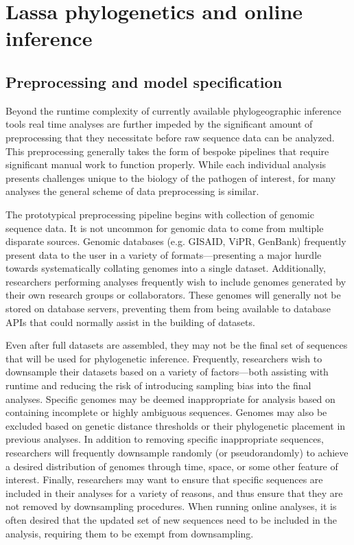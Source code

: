 \section{Lassa phylogenetics and online inference}

\subsection{Preprocessing and model specification}

Beyond the runtime complexity of currently available phylogeographic inference tools real time analyses are further impeded by the significant amount of preprocessing that they necessitate before raw sequence data can be analyzed.
This preprocessing generally takes the form of bespoke pipelines that require significant manual work to function properly.
While each individual analysis presents challenges unique to the biology of the pathogen of interest, for many analyses the general scheme of data preprocessing is similar.

The prototypical preprocessing pipeline begins with collection of genomic sequence data.
It is not uncommon for genomic data to come from multiple disparate sources.
Genomic databases (e.g. GISAID\cite{shu2017gisaid}, ViPR\cite{pickett2012vipr}, GenBank\cite{benson2012genbank}) frequently present data to the user in a variety of formats---presenting a major hurdle towards systematically collating genomes into a single dataset.
Additionally, researchers performing analyses frequently wish to include genomes generated by their own research groups or collaborators.
These genomes will generally not be stored on database servers, preventing them from being available to database APIs that could normally assist in the building of datasets.

Even after full datasets are assembled, they may not be the final set of sequences that will be used for phylogenetic inference.
Frequently, researchers wish to downsample their datasets based on a variety of factors---both assisting with runtime and reducing the risk of introducing sampling bias into the final analyses.
Specific genomes may be deemed inappropriate for analysis based on containing incomplete or highly ambiguous sequences.
Genomes may also be excluded based on genetic distance thresholds or their phylogenetic placement in previous analyses.
In addition to removing specific inappropriate sequences, researchers will frequently downsample randomly (or pseudorandomly) to achieve a desired distribution of genomes through time, space, or some other feature of interest.
Finally, researchers may want to ensure that specific sequences are included in their analyses for a variety of reasons, and thus ensure that they are not removed by downsampling procedures.
When running online analyses, it is often desired that the updated set of new sequences need to be included in the analysis, requiring them to be exempt from downsampling.

